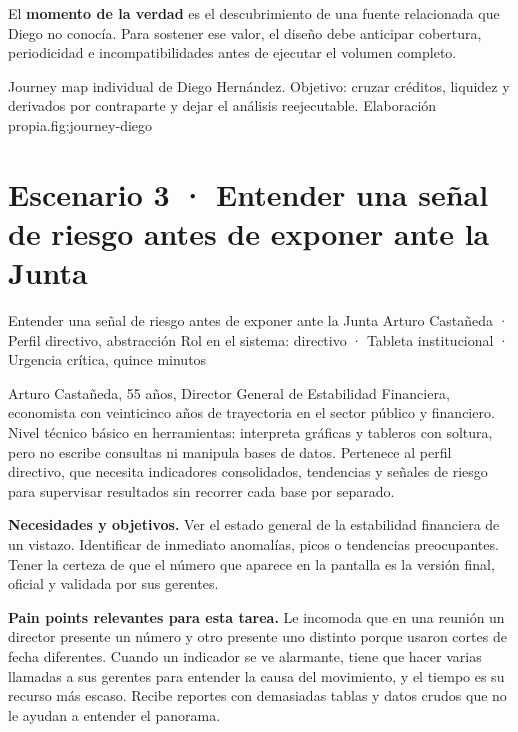 El \textbf{momento de la verdad} es el descubrimiento de una fuente relacionada que Diego no
conocía. Para sostener ese valor, el diseño debe anticipar cobertura, periodicidad e
incompatibilidades antes de ejecutar el volumen completo.

  {Journey map individual de Diego Hernández. Objetivo: cruzar créditos, liquidez y derivados
   por contraparte y dejar el análisis reejecutable. Elaboración propia.}{fig:journey-diego}

\clearpage
{}

\section{Escenario 3 · Entender una señal de riesgo antes de exponer ante la Junta}

  {Entender una señal de riesgo antes de exponer ante la Junta}
  {Arturo Castañeda · Perfil directivo, abstracción}
  {Rol en el sistema: directivo · Tableta institucional · Urgencia crítica, quince minutos}


Arturo Castañeda, 55 años, Director General de Estabilidad Financiera, economista con
veinticinco años de trayectoria en el sector público y financiero. Nivel técnico básico en
herramientas: interpreta gráficas y tableros con soltura, pero no escribe consultas ni
manipula bases de datos. Pertenece al perfil directivo, que necesita indicadores consolidados,
tendencias y señales de riesgo para supervisar resultados sin recorrer cada base por separado.

\textbf{\textcolor{uxnavy}{Necesidades y objetivos.}} Ver el estado general de la estabilidad
financiera de un vistazo. Identificar de inmediato anomalías, picos o tendencias
preocupantes. Tener la certeza de que el número que aparece en la pantalla es la versión
final, oficial y validada por sus gerentes.

\textbf{\textcolor{uxnavy}{Pain points relevantes para esta tarea.}} Le incomoda que en una
reunión un director presente un número y otro presente uno distinto porque usaron cortes de
fecha diferentes. Cuando un indicador se ve alarmante, tiene que hacer varias llamadas a sus
gerentes para entender la causa del movimiento, y el tiempo es su recurso más escaso. Recibe
reportes con demasiadas tablas y datos crudos que no le ayudan a entender el panorama.

